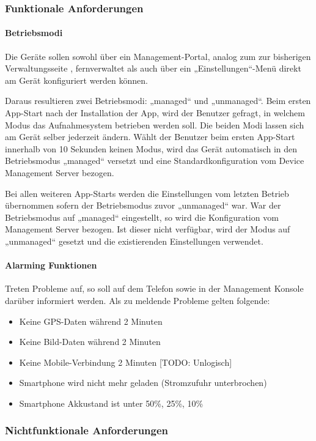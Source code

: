 \subsubsection{Funktionale Anforderungen}
\paragraph{Betriebsmodi}
Die Geräte sollen sowohl über ein Management-Portal, analog zum zur bisherigen Verwaltungsseite , fernverwaltet als auch über ein „Einstellungen“-Menü direkt am Gerät konfiguriert werden können. 

Daraus resultieren zwei Betriebsmodi: „managed“ und „unmanaged“. Beim ersten App-Start nach der Installation der App, wird der Benutzer gefragt, in welchem Modus das Aufnahmesystem betrieben werden soll. Die beiden Modi lassen sich am Gerät selber jederzeit ändern. Wählt der Benutzer beim ersten App-Start innerhalb von 10 Sekunden keinen Modus, wird das Gerät automatisch in den Betriebsmodus „managed“ versetzt und eine Standardkonfiguration vom Device Management Server bezogen.

Bei allen weiteren App-Starts werden die Einstellungen vom letzten Betrieb übernommen sofern der Betriebsmodus zuvor „unmanaged“ war. War der Betriebsmodus auf „managed“ eingestellt, so wird die Konfiguration vom Management Server bezogen. Ist dieser nicht verfügbar, wird der Modus auf „unmanaged“ gesetzt und die existierenden Einstellungen verwendet.

\paragraph{Alarming Funktionen}
Treten Probleme auf, so soll auf dem Telefon sowie in der Management Konsole darüber informiert werden. Als zu meldende Probleme gelten folgende:
\begin{itemize}
\item Keine GPS-Daten während 2 Minuten
\item Keine Bild-Daten während 2 Minuten
\item Keine Mobile-Verbindung 2 Minuten [TODO: Unlogisch]
\item Smartphone wird nicht mehr geladen (Stromzufuhr unterbrochen)
\item Smartphone Akkustand ist unter 50\%, 25\%, 10\%
\end{itemize}
	
\subsubsection{Nichtfunktionale Anforderungen}

